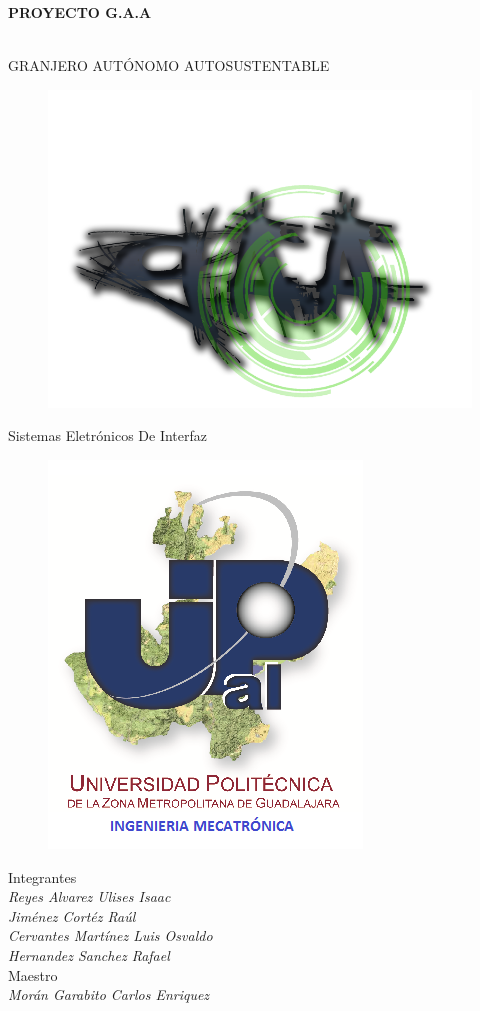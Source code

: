 \documentclass[11pt,a4paper]{article}
\author{Miguel Angel Xamie Diaz Fuentes}
\begin{document}
\begin{center}
\begin{LARGE}
\textbf{PROYECTO G.A.A}
\end{LARGE}
\\
GRANJERO AUTÓNOMO AUTOSUSTENTABLE\\

\begin{figure}[hbtp]
\centering
\includegraphics[scale=0.30]{LOGO.png}
\end{figure}
Sistemas Eletrónicos De Interfaz\\
\begin{figure}[hbtp]
\centering
\includegraphics[scale=0.50]{UPZMG_Mecatr_nica.png}
\end{figure} 


Integrantes
\\\textit{Reyes Alvarez Ulises Isaac\\
Jiménez Cortéz Raúl\\
Cervantes Martínez Luis Osvaldo\\
Hernandez Sanchez Rafael}
\\Maestro
\\\textit{Morán Garabito Carlos Enriquez}
\end{center}
\end{document}
